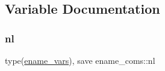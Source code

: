 \subsection{Variable Documentation}
\mbox{\label{namespaceename__coms_a87d8817dfc69ff263d0afc7954d7dbc0}} 
\subsubsection{\texorpdfstring{nl}{nl}}
{\footnotesize\ttfamily type(\hyperlink{structename__coms_1_1ename__vars}{ename\+\_\+vars}), save ename\+\_\+coms\+::nl}

